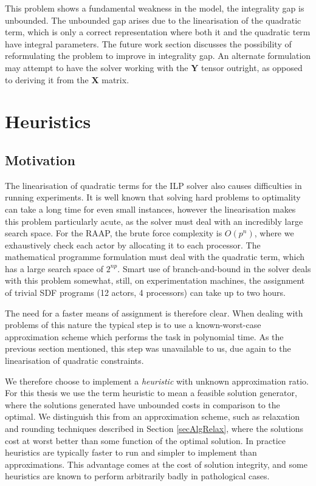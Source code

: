 This problem shows a fundamental weakness in the model, the integrality gap is unbounded.
The unbounded gap arises due to the linearisation of the quadratic term, which is only a correct representation where both it and the quadratic term have integral parameters.
The future work section discusses the possibility of reformulating the problem to improve in integrality gap.
An alternate formulation may attempt to have the solver working with the $\mathbf{Y}$ tensor outright, as opposed to deriving it from the $\mathbf{X}$ matrix.

\section{Heuristics}

\subsection{Motivation}

The linearisation of quadratic terms for the ILP solver also causes difficulties in running experiments.
It is well known that solving hard problems to optimality can take a long time for even small instances, however the linearisation makes this problem particularly acute, as the solver must deal with an incredibly large search space.
For the RAAP, the brute force complexity is $O(p^n)$, where we exhaustively check each actor by allocating it to each processor.
The mathematical programme formulation must deal with the quadratic term, which has a large search space of $2^{np}$.
Smart use of branch-and-bound in the solver deals with this problem somewhat, still, on experimentation machines, the assignment of trivial SDF programs (12 actors, 4 processors) can take up to two hours.

The need for a faster means of assignment is therefore clear.
When dealing with problems of this nature the typical step is to use a known-worst-case approximation scheme which performs the task in polynomial time.
As the previous section mentioned, this step was unavailable to us, due again to the linearisation of quadratic constraints.

We therefore choose to implement a {\em heuristic} with unknown approximation ratio.
For this thesis we use the term heuristic to mean a feasible solution generator, where the solutions generated have unbounded costs in comparison to the optimal.
We distinguish this from an approximation scheme, such as relaxation and rounding techniques described in Section \ref{secAlgRelax}, where the solutions cost at worst better than some function of the optimal solution.
In practice heuristics are typically faster to run and simpler to implement than approximations.
This advantage comes at the cost of solution integrity, and some heuristics are known to perform arbitrarily badly in pathological cases.

